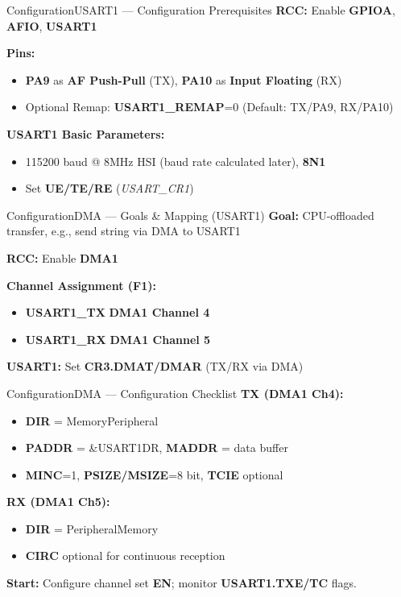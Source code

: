 \documentclass{beamer}
\begin{document}
\begin{frame}{Configuration}{USART1 — Configuration Prerequisites}
	\textbf{RCC:} Enable \textbf{GPIOA}, \textbf{AFIO}, \textbf{USART1}
	
	\medskip
	\textbf{Pins:}
	\begin{itemize}
		\item \textbf{PA9} as \textbf{AF Push-Pull} (TX), \textbf{PA10} as \textbf{Input Floating} (RX)
		\item Optional Remap: \textbf{USART1\_REMAP}=0 (Default: TX/PA9, RX/PA10)
	\end{itemize}
	
	\medskip
	\textbf{USART1 Basic Parameters:}
	\begin{itemize}
		\item 115200 baud @ 8MHz HSI (baud rate calculated later), \textbf{8N1}
		\item Set \textbf{UE/TE/RE} (\textit{USART\_CR1})
	\end{itemize}
\end{frame}

\begin{frame}{Configuration}{DMA — Goals \& Mapping (USART1)}
	\textbf{Goal:} CPU-offloaded transfer, e.g., send string via DMA to USART1
	
	\medskip
	\textbf{RCC:} Enable \textbf{DMA1}
	
	\medskip
	\textbf{Channel Assignment (F1):}
	\begin{itemize}
		\item \textbf{USART1\_TX} \textrightarrow{} \textbf{DMA1 Channel 4}
		\item \textbf{USART1\_RX} \textrightarrow{} \textbf{DMA1 Channel 5}
	\end{itemize}
	
	\medskip
	\textbf{USART1:} Set \textbf{CR3.DMAT/DMAR} (TX/RX via DMA)
\end{frame}

\begin{frame}{Configuration}{DMA — Configuration Checklist}
	\textbf{TX (DMA1 Ch4):}
	\begin{itemize}
		\item \textbf{DIR} = Memory\textrightarrow{}Peripheral
		\item \textbf{PADDR} = \&USART1\textrightarrow{}DR, \textbf{MADDR} = data buffer
		\item \textbf{MINC}=1, \textbf{PSIZE/MSIZE}=8 bit, \textbf{TCIE} optional
	\end{itemize}
	
	\medskip
	\textbf{RX (DMA1 Ch5):}
	\begin{itemize}
		\item \textbf{DIR} = Peripheral\textrightarrow{}Memory
		\item \textbf{CIRC} optional for continuous reception
	\end{itemize}
	
	\medskip
	\textbf{Start:} Configure channel \textrightarrow{} set \textbf{EN}; monitor \textbf{USART1.TXE/TC} flags.
\end{frame}
\end{document}
